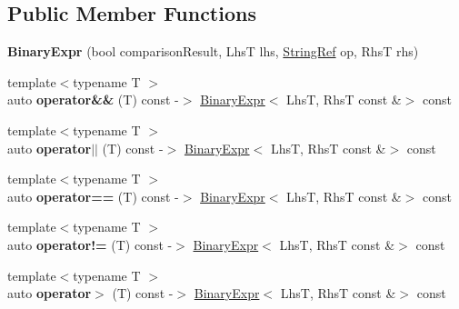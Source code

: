 \subsection*{Public Member Functions}
\begin{DoxyCompactItemize}
\item 
\mbox{\label{classCatch_1_1BinaryExpr_a657d66346aef97a760c22776fe6008b6}} 
{\bfseries Binary\+Expr} (bool comparison\+Result, LhsT lhs, \hyperlink{classCatch_1_1StringRef}{String\+Ref} op, RhsT rhs)
\item 
\mbox{\label{classCatch_1_1BinaryExpr_ab51d6e5b8303c5777fd5af916e2fafff}} 
{\footnotesize template$<$typename T $>$ }\\auto {\bfseries operator\&\&} (T) const -\/$>$ \hyperlink{classCatch_1_1BinaryExpr}{Binary\+Expr}$<$ LhsT, RhsT const \&$>$ const
\item 
\mbox{\label{classCatch_1_1BinaryExpr_a44234233ad4fa42e7c95b6a0d94af9db}} 
{\footnotesize template$<$typename T $>$ }\\auto {\bfseries operator$\vert$$\vert$} (T) const -\/$>$ \hyperlink{classCatch_1_1BinaryExpr}{Binary\+Expr}$<$ LhsT, RhsT const \&$>$ const
\item 
\mbox{\label{classCatch_1_1BinaryExpr_a56d7983b7c826c4924423618ffb40e44}} 
{\footnotesize template$<$typename T $>$ }\\auto {\bfseries operator==} (T) const -\/$>$ \hyperlink{classCatch_1_1BinaryExpr}{Binary\+Expr}$<$ LhsT, RhsT const \&$>$ const
\item 
\mbox{\label{classCatch_1_1BinaryExpr_a1c5d4b87cc18452ebe1254e0067dd476}} 
{\footnotesize template$<$typename T $>$ }\\auto {\bfseries operator!=} (T) const -\/$>$ \hyperlink{classCatch_1_1BinaryExpr}{Binary\+Expr}$<$ LhsT, RhsT const \&$>$ const
\item 
\mbox{\label{classCatch_1_1BinaryExpr_a70b66bfaa6df6f8d04e243fda3e0e1e4}} 
{\footnotesize template$<$typename T $>$ }\\auto {\bfseries operator$>$} (T) const -\/$>$ \hyperlink{classCatch_1_1BinaryExpr}{Binary\+Expr}$<$ LhsT, RhsT const \&$>$ const

\end{DoxyCompactItemize}
